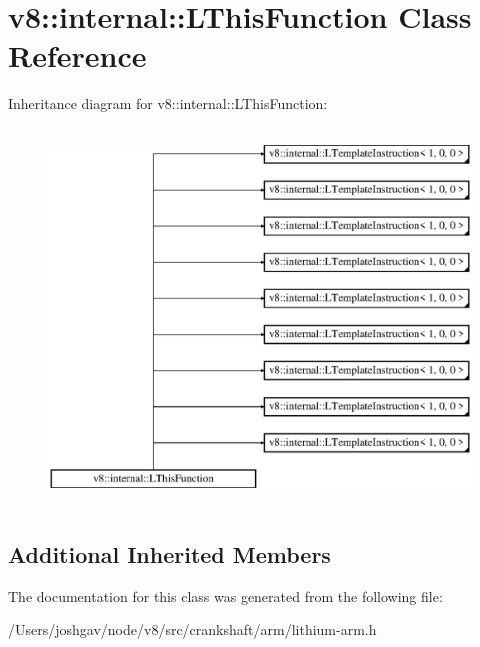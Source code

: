 \hypertarget{classv8_1_1internal_1_1_l_this_function}{}\section{v8\+:\+:internal\+:\+:L\+This\+Function Class Reference}
\label{classv8_1_1internal_1_1_l_this_function}
Inheritance diagram for v8\+:\+:internal\+:\+:L\+This\+Function\+:\begin{figure}[H]
\begin{center}
\leavevmode
\includegraphics[height=10.000000cm]{classv8_1_1internal_1_1_l_this_function}
\end{center}
\end{figure}
\subsection*{Additional Inherited Members}


The documentation for this class was generated from the following file\+:\begin{DoxyCompactItemize}
\item 
/\+Users/joshgav/node/v8/src/crankshaft/arm/lithium-\/arm.\+h\end{DoxyCompactItemize}
